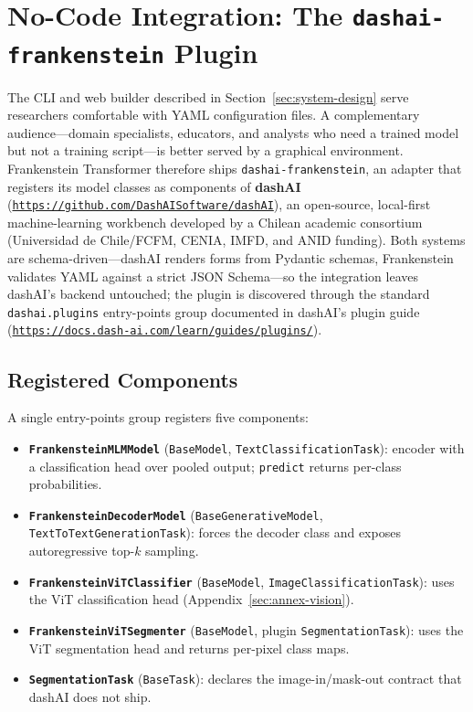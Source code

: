 \section{No-Code Integration: The \texttt{dashai-frankenstein} Plugin}
\label{sec:dashai-plugin}

The CLI and web builder described in Section~\ref{sec:system-design} serve researchers comfortable with YAML configuration files. A complementary audience---domain specialists, educators, and analysts who need a trained model but not a training script---is better served by a graphical environment. Frankenstein Transformer therefore ships \texttt{dashai-frankenstein}, an adapter that registers its model classes as components of \textbf{dashAI} (\texttt{\url{https://github.com/DashAISoftware/dashAI}}), an open-source, local-first machine-learning workbench developed by a Chilean academic consortium (Universidad de Chile/FCFM, CENIA, IMFD, and ANID funding). Both systems are schema-driven---dashAI renders forms from Pydantic schemas, Frankenstein validates YAML against a strict JSON Schema---so the integration leaves dashAI's backend untouched; the plugin is discovered through the standard \texttt{dashai.plugins} entry-points group documented in dashAI's plugin guide (\texttt{\url{https://docs.dash-ai.com/learn/guides/plugins/}}).

\subsection{Registered Components}

A single entry-points group registers five components:
\begin{itemize}[leftmargin=*]
    \item \textbf{\texttt{FrankensteinMLMModel}} (\texttt{BaseModel}, \texttt{TextClassificationTask}): encoder with a classification head over pooled output; \texttt{predict} returns per-class probabilities.
    \item \textbf{\texttt{FrankensteinDecoderModel}} (\texttt{BaseGenerativeModel}, \texttt{TextToTextGenerationTask}): forces the decoder class and exposes autoregressive top-$k$ sampling.
    \item \textbf{\texttt{FrankensteinViTClassifier}} (\texttt{BaseModel}, \texttt{ImageClassificationTask}): uses the ViT classification head (Appendix~\ref{sec:annex-vision}).
    \item \textbf{\texttt{FrankensteinViTSegmenter}} (\texttt{BaseModel}, plugin \texttt{SegmentationTask}): uses the ViT segmentation head and returns per-pixel class maps.
    \item \textbf{\texttt{SegmentationTask}} (\texttt{BaseTask}): declares the image-in/mask-out contract that dashAI does not ship.
\end{itemize}

